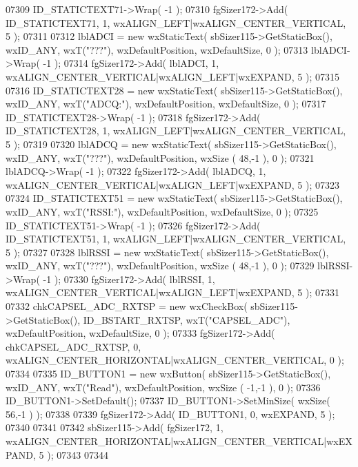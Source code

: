 \begin{DoxyCode}
07309     ID_STATICTEXT71->Wrap( -1 );
07310     fgSizer172->Add( ID_STATICTEXT71, 1, wxALIGN\_LEFT|wxALIGN\_CENTER\_VERTICAL, 5 );
07311     
07312     lblADCI = \textcolor{keyword}{new} wxStaticText( sbSizer115->GetStaticBox(), wxID\_ANY, wxT(\textcolor{stringliteral}{"???"}), wxDefaultPosition, 
      wxDefaultSize, 0 );
07313     lblADCI->Wrap( -1 );
07314     fgSizer172->Add( lblADCI, 1, wxALIGN\_CENTER\_VERTICAL|wxALIGN\_LEFT|wxEXPAND, 5 );
07315     
07316     ID_STATICTEXT28 = \textcolor{keyword}{new} wxStaticText( sbSizer115->GetStaticBox(), wxID\_ANY, wxT(\textcolor{stringliteral}{"ADCQ:"}), 
      wxDefaultPosition, wxDefaultSize, 0 );
07317     ID_STATICTEXT28->Wrap( -1 );
07318     fgSizer172->Add( ID_STATICTEXT28, 1, wxALIGN\_LEFT|wxALIGN\_CENTER\_VERTICAL, 5 );
07319     
07320     lblADCQ = \textcolor{keyword}{new} wxStaticText( sbSizer115->GetStaticBox(), wxID\_ANY, wxT(\textcolor{stringliteral}{"???"}), wxDefaultPosition, wxSize
      ( 48,-1 ), 0 );
07321     lblADCQ->Wrap( -1 );
07322     fgSizer172->Add( lblADCQ, 1, wxALIGN\_CENTER\_VERTICAL|wxALIGN\_LEFT|wxEXPAND, 5 );
07323     
07324     ID_STATICTEXT51 = \textcolor{keyword}{new} wxStaticText( sbSizer115->GetStaticBox(), wxID\_ANY, wxT(\textcolor{stringliteral}{"RSSI:"}), 
      wxDefaultPosition, wxDefaultSize, 0 );
07325     ID_STATICTEXT51->Wrap( -1 );
07326     fgSizer172->Add( ID_STATICTEXT51, 1, wxALIGN\_LEFT|wxALIGN\_CENTER\_VERTICAL, 5 );
07327     
07328     lblRSSI = \textcolor{keyword}{new} wxStaticText( sbSizer115->GetStaticBox(), wxID\_ANY, wxT(\textcolor{stringliteral}{"???"}), wxDefaultPosition, wxSize
      ( 48,-1 ), 0 );
07329     lblRSSI->Wrap( -1 );
07330     fgSizer172->Add( lblRSSI, 1, wxALIGN\_CENTER\_VERTICAL|wxALIGN\_LEFT|wxEXPAND, 5 );
07331     
07332     chkCAPSEL_ADC_RXTSP = \textcolor{keyword}{new} wxCheckBox( sbSizer115->GetStaticBox(), 
      ID_BSTART_RXTSP, wxT(\textcolor{stringliteral}{"CAPSEL\_ADC"}), wxDefaultPosition, wxDefaultSize, 0 );
07333     fgSizer172->Add( chkCAPSEL_ADC_RXTSP, 0, wxALIGN\_CENTER\_HORIZONTAL|wxALIGN\_CENTER\_VERTICAL, 0 );
07334     
07335     ID_BUTTON1 = \textcolor{keyword}{new} wxButton( sbSizer115->GetStaticBox(), wxID\_ANY, wxT(\textcolor{stringliteral}{"Read"}), wxDefaultPosition, wxSize
      ( -1,-1 ), 0 );
07336     ID_BUTTON1->SetDefault(); 
07337     ID_BUTTON1->SetMinSize( wxSize( 56,-1 ) );
07338     
07339     fgSizer172->Add( ID_BUTTON1, 0, wxEXPAND, 5 );
07340     
07341     
07342     sbSizer115->Add( fgSizer172, 1, wxALIGN\_CENTER\_HORIZONTAL|wxALIGN\_CENTER\_VERTICAL|wxEXPAND, 5 );
07343     
07344     

\end{DoxyCode}
